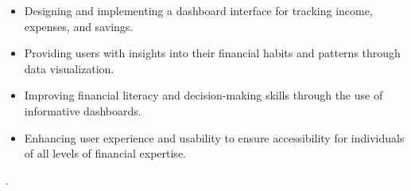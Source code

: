\documentclass[12pt]{report}
\begin{document}
\begin{itemize}
   
     \item Designing and implementing a dashboard interface for tracking income, expenses, and savings.
     \item Providing users with insights into their financial habits and patterns through data visualization.
     \item Improving financial literacy and decision-making skills through the use of informative dashboards.
    \item Enhancing user experience and usability to ensure accessibility for individuals of all levels of financial expertise.
\end{itemize}


    









 \cite{techtarget, sqlspreads}.
\end{document}
